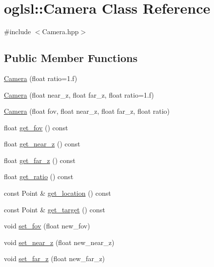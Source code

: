 \hypertarget{classoglsl_1_1_camera}{}\section{oglsl\+:\+:Camera Class Reference}
\label{classoglsl_1_1_camera}


{\ttfamily \#include $<$Camera.\+hpp$>$}

\subsection*{Public Member Functions}
\begin{DoxyCompactItemize}
\item 
\mbox{\hyperlink{classoglsl_1_1_camera_abb13e0c73a2478c0eb88466438a705ac}{Camera}} (float ratio=1.f)
\item 
\mbox{\hyperlink{classoglsl_1_1_camera_a725f993e05b3bd5d1c7b2d9c857406d4}{Camera}} (float near\+\_\+z, float far\+\_\+z, float ratio=1.f)
\item 
\mbox{\hyperlink{classoglsl_1_1_camera_a1fcaea89ed1e9933d8c842c91c2826e8}{Camera}} (float fov, float near\+\_\+z, float far\+\_\+z, float ratio)
\item 
float \mbox{\hyperlink{classoglsl_1_1_camera_a25329c200eb972bd291e69550bc36b76}{get\+\_\+fov}} () const
\item 
float \mbox{\hyperlink{classoglsl_1_1_camera_acd70d8db4ba96a511b65980ada6c7d99}{get\+\_\+near\+\_\+z}} () const
\item 
float \mbox{\hyperlink{classoglsl_1_1_camera_aea9f12c1bc947a01bc5e6a4e57edec3d}{get\+\_\+far\+\_\+z}} () const
\item 
float \mbox{\hyperlink{classoglsl_1_1_camera_a3b63f5ced299648edb5d59305af17607}{get\+\_\+ratio}} () const
\item 
const Point \& \mbox{\hyperlink{classoglsl_1_1_camera_a39b53d2b1aafd94d080c843f1fe52b4a}{get\+\_\+location}} () const
\item 
const Point \& \mbox{\hyperlink{classoglsl_1_1_camera_ad326436aa613e959f4af37f55f2d3bdb}{get\+\_\+target}} () const
\item 
void \mbox{\hyperlink{classoglsl_1_1_camera_a51ad7034c0a10ad19b20e33bd46eca44}{set\+\_\+fov}} (float new\+\_\+fov)
\item 
void \mbox{\hyperlink{classoglsl_1_1_camera_a69c283b01b97024ec296487f6cddabb6}{set\+\_\+near\+\_\+z}} (float new\+\_\+near\+\_\+z)
\item 
void \mbox{\hyperlink{classoglsl_1_1_camera_aa748211e2ac590c69fa8557df337139e}{set\+\_\+far\+\_\+z}} (float new\+\_\+far\+\_\+z)

\end{DoxyCompactItemize}
